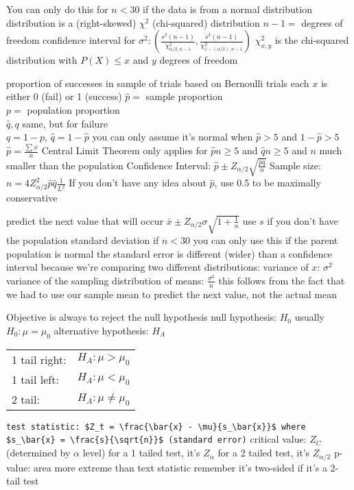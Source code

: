 \documentclass{article}
\begin{document}
\begin{multicols*}{2}
\begin{outline}[compactitem]
  \1 You can only do this for $n<30$ if the data is from a normal distribution
  \1 distribution is a (right-skewed) $\chi^2$ (chi-squared) distribution
  \1 $n-1=$ degrees of freedom
  \1 confidence interval for $\sigma^2: \left(
      \frac{s^2(n-1)}{\chi^2_{\alpha/2, n-1}}, 
      \frac{s^2(n-1)}{\chi^2_{1-(\alpha/2), n-1}} 
    \right)$
    \2 $\chi^2_{x, y}$ is the chi-squared distribution with $P(X)\leq x$ and $y$ degrees of freedom

  \1 proportion of successes in sample of trials
  \1 based on Bernoulli trials
    \2 each $x$ is either 0 (fail) or 1 (success)
  \1 $\hat{p} = $ sample proportion
    \\ $p=$ population proportion
    \\ $\hat{q}, q$ same, but for failure
    \\ $q=1-p$,  $\hat{q}=1-\hat{p}$
  \1 you can only assume it's normal when $\hat{p}>5$ and $1-\hat{p}>5$
  \1 $\hat{p} = \frac{\sum x}{n}$
  \1 Central Limit Theorem only applies for $\hat{p}n\geq5$ and $\hat{q}n\geq5$ and $n$ much smaller than the population
  \1 Confidence Interval:
    $\hat{p} \pm Z_{\alpha/2}\sqrt{\frac{\hat{p}\hat{q}}{n}}$
  \1 Sample size:
    $n = 4Z^2_{\alpha/2}\hat{p}\hat{q}\frac{1}{L^2}$
    \2 If you don't have any idea about $\hat{p}$, use 0.5 to be maximally conservative

  \1 predict the next value that will occur
  \1 $\bar{x} \pm Z_{\alpha/2}\sigma\sqrt{1+\frac{1}{n}}$
    \2 use $s$ if you don't have the population standard deviation
  \1 if $n<30$ you can only use this if the parent population is normal
  \1 the standard error is different (wider) than a confidence interval because we're comparing two different distributions:
    \2 variance of $x$: $\sigma^2$
    \2 variance of the sampling distribution of means: $\frac{\sigma^2}{n}$
  \1 this follows from the fact that we had to use our sample mean to predict the next value, not the actual mean

  \1 Objective is always to reject the null hypothesis
  \1 null hypothesis: $H_0$
    \2 usually $H_0: \mu = \mu_0$
  \1 alternative hypothesis: $H_A$
    \\\begin{tabular}{l r}
      1 tail right: & $H_A: \mu     > \mu_0$ \\
      1 tail left:  & $H_A: \mu     < \mu_0$ \\
      2 tail:       & $H_A: \mu \not= \mu_0$ \\
    \end{tabular}
  \1 \verb|test statistic: $Z_t = \frac{\bar{x} - \mu}{s_\bar{x}}$ where $s_\bar{x} = \frac{s}{\sqrt{n}}$ (standard error)|
  \1 critical value: $Z_C$ (determined by $\alpha$ level)
    \2 for a 1 tailed test, it's $Z_\alpha$
    \2 for a 2 tailed test, it's $Z_{\alpha/2}$
  \1 p-value: area more extreme than text statistic
    \2 remember it's two-sided if it's a 2-tail test


\end{outline}
\end{multicols*}
\end{document}
